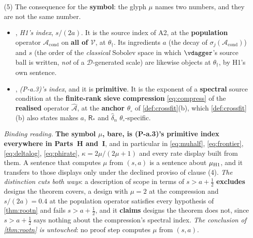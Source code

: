 \begin{remark}
(5) The consequence for the \textbf{symbol}: the glyph $\mu$ names two numbers, and they are not
the same number.
\begin{itemize}
\item[$\mu_{\text{\textup{H1}}}$], \emph{H1's index}, $s/(2a)$. It is the source index of
A2, at the \textbf{population} operator $\mathcal A_{\mathrm{cond}}$ on \textbf{all of
$\mathcal V$}, at $\theta_\dagger$. Its ingredients $a$ (the decay of $\sigma_j(\mathcal A_{\mathrm{cond}})$)
and $s$ (the order of the \emph{classical} Sobolev space in which $\vdagger$'s source ball is written,
\emph{not} of a $\mathcal D$-generated scale) are
likewise objects at $\theta_\dagger$, by H1's own sentence.
\item[$\mu$], \emph{(P-a.3)'s index}, and it is \textbf{primitive}. It is the exponent of a
\textbf{spectral} source condition at the \textbf{finite-rank sieve compression} \eqref{eq:compress} of the
\textbf{realised} operator $\hat{\mathcal A}$, at the \textbf{anchor $\theta_\circ$} of
\cref{def:crossfit}(b), which \cref{def:crossfit}(b) also states makes $a$, $\mathsf R_\ast$ and
$\hat\delta_n$ $\theta_\circ$-specific.
\end{itemize}
\emph{Binding reading.} \textbf{The symbol $\mu$, bare, is
(P-a.3)'s primitive index everywhere in Parts~H and~I}, and in particular in \eqref{eq:muhalf},
\eqref{eq:frontier}, \eqref{eq:deltalog}, \eqref{eq:phirate}, $\kappa=2\mu/(2\mu+1)$ and every rate display
built from them. A sentence that computes $\mu$ from $(s,a)$ is a sentence about
$\mu_{\text{\textup{H1}}}$, and it transfers to those displays only under the declined proviso of clause
\textup{(4)}.
\emph{The distinction cuts both ways}: a description of scope in terms of $s>a+\tfrac12$ \textbf{excludes}
designs the theorem covers, a design with $\mu=2$ at the compression and $s/(2a)=0.4$ at the population
operator satisfies every hypothesis of \cref{thm:rootn} and fails $s>a+\tfrac12$, and it
\textbf{claims} designs the theorem does not, since $s>a+\tfrac12$ says nothing about the compression's
spectral index. \emph{The conclusion of \cref{thm:rootn} is untouched}: no proof step computes $\mu$ from
$(s,a)$.
\end{remark}

